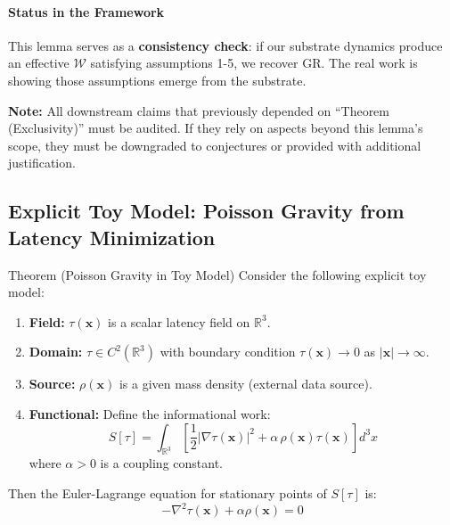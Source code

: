 \documentclass[11pt,titlepage]{article}
\begin{document}
\paragraph{Status in the Framework}
This lemma serves as a \textbf{consistency check}: if our substrate dynamics produce an effective $\mathcal{W}$ satisfying assumptions 1-5, we recover GR. The real work is showing those assumptions emerge from the substrate.

\textbf{Note:} All downstream claims that previously depended on ``Theorem (Exclusivity)'' must be audited. If they rely on aspects beyond this lemma's scope, they must be downgraded to conjectures or provided with additional justification.



\subsection{Explicit Toy Model: Poisson Gravity from Latency Minimization}

\begin{mytheorem}{Theorem (Poisson Gravity in Toy Model)}
\label{thm:poisson-toy}
Consider the following explicit toy model:
\begin{enumerate}
    \item \textbf{Field:} $\tau(\mathbf{x})$ is a scalar latency field on $\mathbb{R}^3$.
    \item \textbf{Domain:} $\tau \in C^2(\mathbb{R}^3)$ with boundary condition $\tau(\mathbf{x}) \to 0$ as $|\mathbf{x}| \to \infty$.
    \item \textbf{Source:} $\rho(\mathbf{x})$ is a given mass density (external data source).
    \item \textbf{Functional:} Define the informational work:
    \[
    S[\tau] = \int_{\mathbb{R}^3} \left[ \frac{1}{2} |\nabla \tau(\mathbf{x})|^2 + \alpha \, \rho(\mathbf{x}) \tau(\mathbf{x}) \right] d^3x
    \]
    where $\alpha > 0$ is a coupling constant.
\end{enumerate}
Then the Euler-Lagrange equation for stationary points of $S[\tau]$ is:
\[
-\nabla^2 \tau(\mathbf{x}) + \alpha \rho(\mathbf{x}) = 0
\]
\end{mytheorem}
\end{document}
